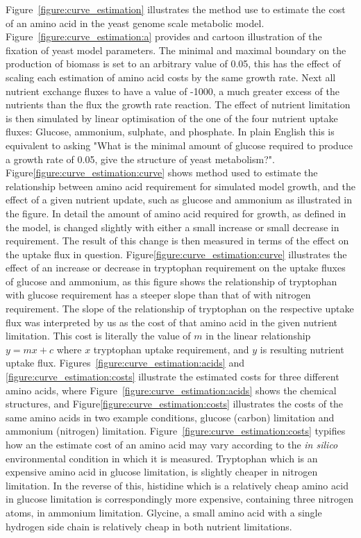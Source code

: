 Figure~\vref{figure:curve_estimation} illustrates the method use to estimate the cost of an amino acid in the yeast genome scale metabolic model. Figure~\vref{figure:curve_estimation:a} provides and cartoon illustration of the fixation of yeast model parameters. The minimal and maximal boundary on the production of biomass is set to an arbitrary value of 0.05, this has the effect of scaling each estimation of amino acid costs by the same growth rate. Next all nutrient exchange fluxes to have a value of -1000, a much greater excess of the nutrients than the flux the growth rate reaction. The effect of nutrient limitation is then simulated by linear optimisation of the one of the four nutrient uptake fluxes: Glucose, ammonium, sulphate, and phosphate. In plain English this is equivalent to asking "What is the minimal amount of glucose required to produce a growth rate of 0.05, give the structure of yeast metabolism?". Figure\vref{figure:curve_estimation:curve} shows method used to estimate the relationship between amino acid requirement for simulated model growth, and the effect of a given nutrient update, such as glucose and ammonium as illustrated in the figure. In detail the amount of amino acid required for growth, as defined in the model, is changed slightly with either a small increase or small decrease in requirement. The result of this change is then measured in terms of the effect on the uptake flux in question. Figure\vref{figure:curve_estimation:curve} illustrates the effect of an increase or decrease in tryptophan requirement on the uptake fluxes of glucose and ammonium, as this figure shows the relationship of tryptophan with glucose requirement has a steeper slope than that of with nitrogen requirement. The slope of the relationship of tryptophan on the respective uptake flux was interpreted by us as the cost of that amino acid in the given nutrient limitation. This cost is literally the value of $m$ in the linear relationship $y = mx + c$ where $x$ tryptophan uptake requirement, and $y$ is resulting nutrient uptake flux. Figures~\vref{figure:curve_estimation:acids} and \vref{figure:curve_estimation:costs} illustrate the estimated costs for three different amino acids, where Figure~\vref{figure:curve_estimation:acids} shows the chemical structures, and Figure\ref{figure:curve_estimation:costs} illustrates the costs of the same amino acids in two example conditions, glucose (carbon) limitation and ammonium (nitrogen) limitation. Figure~\vref{figure:curve_estimation:costs} typifies how an the estimate cost of an amino acid may vary according to the \emph{in silico} environmental condition in which it is measured. Tryptophan which is an expensive amino acid in glucose limitation, is slightly cheaper in nitrogen limitation. In the reverse of this, histidine which is a relatively cheap amino acid in glucose limitation is correspondingly more expensive, containing three nitrogen atoms, in ammonium limitation. Glycine, a small amino acid with a single hydrogen side chain is relatively cheap in both nutrient limitations.

